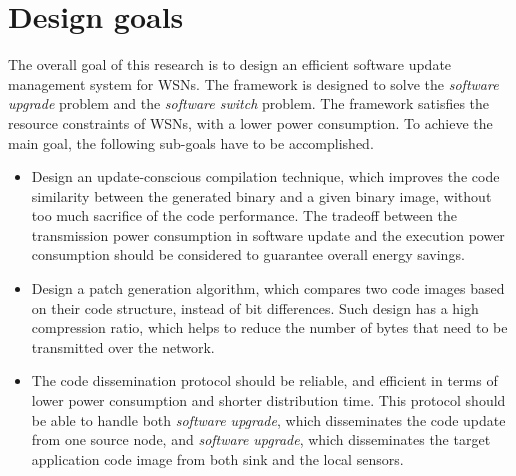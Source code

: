 \section{Design goals}
The overall goal of this research is to design an efficient software update management system for WSNs. The framework is designed to solve the {\em software upgrade} problem and the {\em software switch} problem. The framework satisfies the resource constraints of WSNs, with a lower power consumption. To achieve the main goal, the following sub-goals have to be accomplished.
\begin{itemize}
	\item Design an update-conscious compilation technique, which improves the code similarity between the generated binary and  a given binary image, without too much sacrifice of the code performance. The tradeoff between the transmission power consumption in software update and the execution power consumption should be considered to guarantee overall energy savings.
	\item Design a patch generation algorithm, which compares two code images based on their code structure, instead of bit differences. Such design has a high compression ratio, which helps to reduce the number of bytes that need to be transmitted over the network. 
	\item The code dissemination protocol should be reliable, and efficient in terms of lower power consumption and shorter distribution time. This protocol should be able to handle both {\em software upgrade}, which disseminates the code update from one source node, and {\em software upgrade}, which disseminates the target application code image from both sink and the local sensors.
\end{itemize}

